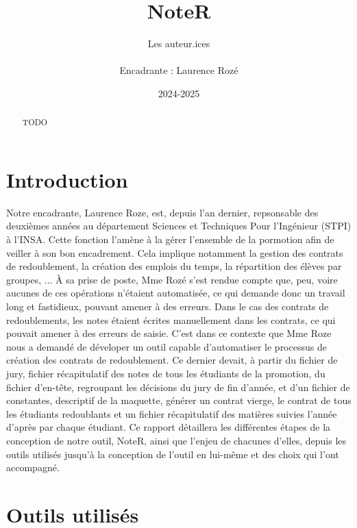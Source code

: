 \documentclass[a4paper,11pt]{article}
\title{\textbf{NoteR}}
\author{Les auteur.ices
	\\ \\
	Encadrante : Laurence Rozé}
\date{2024-2025}                    %
\begin{document}
  \maketitle %



\begin{abstract}
TODO
\end{abstract}

\section*{Introduction}
	Notre encadrante, Laurence Roze, est, depuis l'an dernier, repsonsable des deuxièmes années au département Sciences et Techniques Pour l'Ingénieur (STPI) à l'INSA. Cette fonction l'amène à la gérer l'ensemble de la pormotion afin de veiller à son bon encadrement. Cela implique notamment la gestion des contrats de redoublement, la création des emplois du temps, la répartition des élèves par groupes, ... À sa prise de poste, Mme Rozé s'est rendue compte que, peu, voire aucunes de ces opérations n'étaient automatisée, ce qui demande donc un travail long et fastidieux, pouvant amener à des erreurs. Dans le cas des contrats de redoublements, les notes étaient écrites manuellement dans les contrats, ce qui pouvait amener à des erreurs de saisie. C'est dans ce contexte que Mme Roze nous a demandé de déveloper un outil capable d'automatiser le processus de création des contrats de redoublement. Ce dernier devait, à partir du fichier de jury, fichier récapitulatif des notes de tous les étudiants de la promotion, du fichier d'en-tête, regroupant les décisions du jury de fin d'année, et d'un fichier de constantes, descriptif de la maquette, générer un contrat vierge, le contrat de tous les étudiants redoublants et un fichier récapitulatif des matières suivies l'année d'après par chaque étudiant. Ce rapport détaillera les différentes étapes de la conception de notre outil, NoteR, ainsi que l'enjeu de chacunes d'elles, depuis les outils utilisés jusqu'à la conception de l'outil en lui-même et des choix qui l'ont accompagné.

\section{Outils utilisés}
\end{document}
